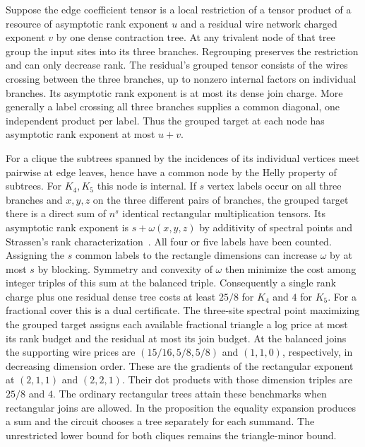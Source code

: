 \documentclass[11pt,letterpaper]{article}
\begin{document}
Suppose the edge coefficient tensor is a local restriction of a tensor
product of a resource of asymptotic rank exponent \(u\) and a residual
wire network charged exponent \(v\) by one dense contraction tree.
At any trivalent node of that tree group the input sites into its three
branches. Regrouping preserves the restriction and can only decrease rank.
The residual's grouped tensor consists of the wires crossing between the
three branches, up to nonzero internal factors on individual branches.
Its asymptotic rank exponent is at most its dense join charge. More
generally a label crossing all three branches supplies a common diagonal,
one independent product per label. Thus the grouped target at each node
has asymptotic rank exponent at most \(u+v\).

For a clique the subtrees spanned by the incidences of its individual
vertices meet pairwise at edge leaves, hence have a common node by the
Helly property of subtrees. For \(K_4,K_5\) this node is internal.
If \(s\) vertex labels occur on all three branches and \(x,y,z\) on the
three different pairs of branches, the grouped target there is a direct sum
of \(n^s\) identical rectangular multiplication tensors. Its asymptotic
rank exponent is \(s+\omega(x,y,z)\) by additivity of spectral points
and Strassen's rank characterization~\cite{strassen-spectrum}. All four
or five labels have been counted. Assigning the \(s\) common labels to
the rectangle dimensions can increase \(\omega\) by at most \(s\) by
blocking. Symmetry and convexity of \(\omega\) then minimize the cost
among integer triples of this sum at the balanced triple. Consequently a
single rank charge plus one residual dense tree costs at least \(25/8\)
for \(K_4\) and \(4\) for \(K_5\). For a fractional cover this is a dual certificate. The three-site spectral
point maximizing the grouped target assigns each available fractional
triangle a log price at most its rank budget and the residual at most its
join budget. At the balanced joins the supporting wire prices are
\((15/16,5/8,5/8)\) and \((1,1,0)\), respectively, in decreasing dimension
order. These are the gradients of the rectangular exponent at
\((2,1,1)\) and \((2,2,1)\). Their dot products with those dimension triples
are \(25/8\) and \(4\).
The ordinary rectangular trees attain
these benchmarks when rectangular joins are allowed. In the proposition
the equality expansion produces a sum and the circuit chooses a tree
separately for each summand. The unrestricted lower bound for both cliques
remains the triangle-minor bound.
\end{document}
